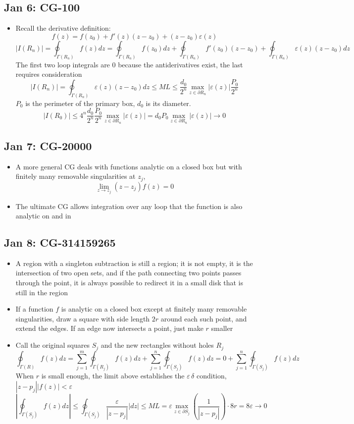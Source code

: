 \documentclass[10pt, oneside]{article}
\let\del\partial
\let\ep\varepsilon
\let\de\delta
\let\leq\leqslant
\begin{document}
\subsection{Jan 6: CG-100}
\begin{itemize}
    \item Recall the derivative definition:
        \[f(z) = f(z_0) + f'(z)(z - z_0) + (z - z_0) \ep(z)\]
        \[|I(R_n)| = \oint_{\Gamma(R_n)} f(z) dz = \oint_{\Gamma(R_n)} f(z_0) dz + \oint_{\Gamma(R_n)} f'(z_0)(z - z_0) + \oint_{\Gamma(R_n)} \ep(z) (z - z_0) dz\]
        The first two loop integrals are $0$ because the antiderivatives exist, the last requires consideration
        \[|I(R_n)| = \oint_{\Gamma(R_n)} \ep(z) (z - z_0) dz \leq ML \leq \frac{d_0}{2^n} \max_{z \in \del R_n} |\ep(z)| \frac{P_0}{2^n}\]
        $P_0$ is the perimeter of the primary box, $d_0$ is its diameter.
        \[|I(R_0)| \leq 4^n \frac{d_0}{2^n}\frac{P_0}{2^n} \max_{z \in \del R_n} |\ep(z)| = d_0 P_0 \max_{z \in \del R_n} |\ep(z)| \rightarrow 0\]
\end{itemize}

\subsection{Jan 7: CG-20000}
\begin{itemize}
    \item A more general CG deals with functions analytic on a closed box but with finitely many removable singularities at $z_j$,
        \[\lim_{z \rightarrow z_j} (z - z_j) f(z) = 0\]
    \item The ultimate CG allows integration over any loop that the function is also analytic on and in
\end{itemize}

\subsection{Jan 8: CG-314159265}
\begin{itemize}
    \item A region with a singleton subtraction is still a region; it is not empty, it is the intersection of two open sets, and if the path connecting two points passes through the point, it is always possible to redirect it in a small disk that is still in the region
    \item If a function $f$ is analytic on a closed box except at finitely many removable singularities, draw a square with side length $2r$ around each such point, and extend the edges. If an edge now intersects a point, just make $r$ smaller
    \item Call the original squares $S_j$ and the new rectangles without holes $R_j$
        \[\oint_{\Gamma(R)} f(z) dz = \sum_{j=1}^m \oint_{\Gamma(R_j)} f(z) dz + \sum_{j=1}^n \oint_{\Gamma(S_j)} f(z) dz = 0 + \sum_{j=1}^n \oint_{\Gamma(S_j)} f(z) dz\]
        When $r$ is small enough, the limit above establishes the $\ep \, \de$ condition, $|z - p_j||f(z)| < \ep$
        \[\left|\oint_{\Gamma(S_j)} f(z) dz\right| \leq \oint_{\Gamma(S_j)} \frac{\ep}{|z - p_j|} |dz| \leq ML = \ep \max_{z \in \del S_j} \left( \frac{1}{|z - p_j|}\right) \cdot 8r = 8\ep \rightarrow 0\]
\end{itemize}
\end{document}
